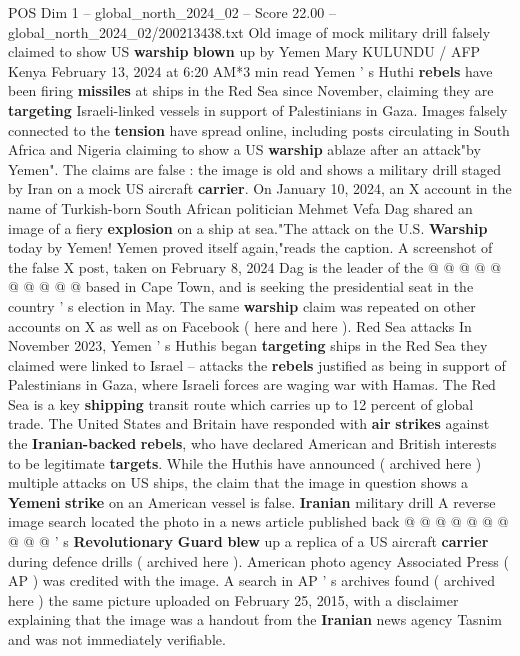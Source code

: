 \begin{textsample}{POS Dim 1 – global\_north\_2024\_02 – Score 22.00 – global\_north\_2024\_02/200213438.txt}  \label{ex:f1_pos_280}
Old image of mock military drill falsely claimed to show US \textbf{warship} \textbf{blown} up by Yemen Mary KULUNDU / AFP Kenya February 13, 2024 at 6:20 AM*3 min read Yemen ' s Huthi \textbf{rebels} have been firing \textbf{missiles} at ships in the Red Sea since November, claiming they are \textbf{targeting} Israeli-linked vessels in support of Palestinians in Gaza.
Images falsely connected to the \textbf{tension} have spread online, including posts circulating in South Africa and Nigeria claiming to show a US \textbf{warship} ablaze after an attack"by Yemen".
The claims are false : the image is old and shows a military drill staged by Iran on a mock US aircraft \textbf{carrier}.
On January 10, 2024, an X account in the name of Turkish-born South African politician Mehmet Vefa Dag shared an image of a fiery \textbf{explosion} on a ship at sea."The attack on the U.S. \textbf{Warship} today by Yemen!
Yemen proved itself again,"reads the caption.
A screenshot of the false X post, taken on February 8, 2024 Dag is the leader of the @ @ @ @ @ @ @ @ @ @ based in Cape Town, and is seeking the presidential seat in the country ' s election in May.
The same \textbf{warship} claim was repeated on other accounts on X as well as on Facebook ( here and here ).
Red Sea attacks In November 2023, Yemen ' s Huthis began \textbf{targeting} ships in the Red Sea they claimed were linked to Israel -- attacks the \textbf{rebels} justified as being in support of Palestinians in Gaza, where Israeli forces are waging war with Hamas.
The Red Sea is a key \textbf{shipping} transit route which carries up to 12 percent of global trade.
The United States and Britain have responded with \textbf{air} \textbf{strikes} against the \textbf{Iranian-backed} \textbf{rebels}, who have declared American and British interests to be legitimate \textbf{targets}.
While the Huthis have announced ( archived here ) multiple attacks on US ships, the claim that the image in question shows a \textbf{Yemeni} \textbf{strike} on an American vessel is false. \textbf{Iranian} military drill A reverse image search located the photo in a news article published back @ @ @ @ @ @ @ @ @ @ ' s \textbf{Revolutionary} \textbf{Guard} \textbf{blew} up a replica of a US aircraft \textbf{carrier} during defence drills ( archived here ).
American photo agency Associated Press ( AP ) was credited with the image.
A search in AP ' s archives found ( archived here ) the same picture uploaded on February 25, 2015, with a disclaimer explaining that the image was a handout from the \textbf{Iranian} news agency Tasnim and was not immediately verifiable.

\end{textsample}
